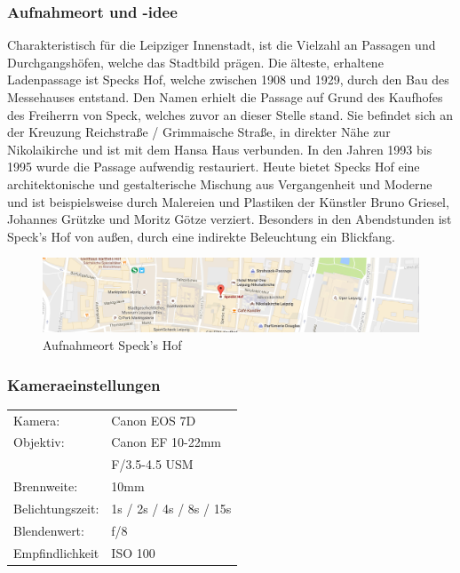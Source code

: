 \documentclass[liststotoc,bibtotoc,fontsize=14pt,]{scrreprt}
\begin{document}
			\subsubsection{Aufnahmeort und -idee}
						Charakteristisch für die Leipziger Innenstadt, ist die Vielzahl an Passagen und Durchgangshöfen, welche das Stadtbild prägen. Die älteste, erhaltene Ladenpassage ist Speck\grq s Hof, welche zwischen 1908 und 1929, durch den Bau des Messehauses entstand. Den Namen erhielt die Passage auf Grund des Kaufhofes des Freiherrn von Speck, welches zuvor an dieser Stelle stand. Sie befindet sich an der Kreuzung Reichstraße / Grimmaische Straße, in direkter Nähe zur Nikolaikirche und ist mit dem Hansa Haus verbunden. In den Jahren 1993 bis 1995 wurde die Passage aufwendig restauriert. Heute bietet Speck\grq s Hof eine architektonische und gestalterische Mischung aus Vergangenheit und Moderne und ist beispielsweise durch Malereien und Plastiken der Künstler Bruno Griesel, Johannes Grützke und Moritz Götze verziert. Besonders in den Abendstunden ist Speck's Hof von außen, durch eine indirekte Beleuchtung ein Blickfang. 

\begin{figure}[H]
	\includegraphics[width=\linewidth]{img/places/sh_map.jpg}
	\caption{Aufnahmeort Speck's Hof}
	\label{img:sh_map}
\end{figure}

\subsubsection{Kameraeinstellungen}
\begin{minipage}{0.58\textwidth}
	\begin{tabular}{ll}
		Kamera: &Canon EOS 7D \\
		Objektiv: &Canon EF 10-22mm \\
		& F/3.5-4.5 USM\\		
		Brennweite:&  10mm \\
		Belichtungszeit: & 1s / 2s / 4s / 8s / 15s\\
		Blendenwert: & f/8\\
		Empfindlichkeit & ISO 100 \\
	\end{tabular}\\
\end{minipage}%
\begin{minipage}{0.42\textwidth}
	
\end{minipage}%
		
\end{document}
